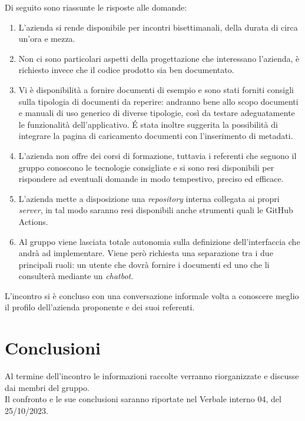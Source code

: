 \noindent
Di seguito sono riassunte le risposte alle domande:
\begin{enumerate}
	\item L'azienda si rende disponibile per incontri bisettimanali, della durata di circa un'ora e mezza.
	\item Non ci sono particolari aspetti della progettazione che interessano l'azienda, è richiesto invece che il codice prodotto sia ben documentato.
	\item Vi è disponibilità a fornire documenti di esempio e sono stati forniti consigli sulla tipologia di documenti da reperire: andranno bene allo scopo documenti e manuali di uso generico di diverse tipologie, così da testare adeguatamente le funzionalità dell'applicativo. \'E stata inoltre suggerita la possibilità di integrare la pagina di caricamento documenti con l'inserimento di metadati.
	\item L'azienda non offre dei corsi di formazione, tuttavia i referenti che seguono il gruppo conoscono le tecnologie consigliate e si sono resi disponibili per rispondere ad eventuali domande in modo tempestivo, preciso ed	efficace.
	\item L'azienda mette a disposizione una \textit{repository} interna collegata ai propri \textit{server}, in tal modo saranno resi disponibili anche strumenti quali le GitHub Actions.
	\item Al gruppo viene lasciata totale autonomia sulla definizione dell'interfaccia che andrà ad implementare. Viene però richiesta una separazione tra i due principali ruoli: un utente che dovrà fornire i documenti ed uno che li consulterà mediante un \textit{chatbot}.
\end{enumerate}

\noindent
L'incontro si è concluso con una conversazione informale volta a conoscere meglio il profilo dell'azienda proponente e dei suoi referenti.


\section{Conclusioni}
Al termine dell'incontro le informazioni raccolte verranno riorganizzate e discusse dai membri del gruppo. \\
Il confronto e le sue conclusioni saranno riportate nel Verbale interno 04, del 25/10/2023.

